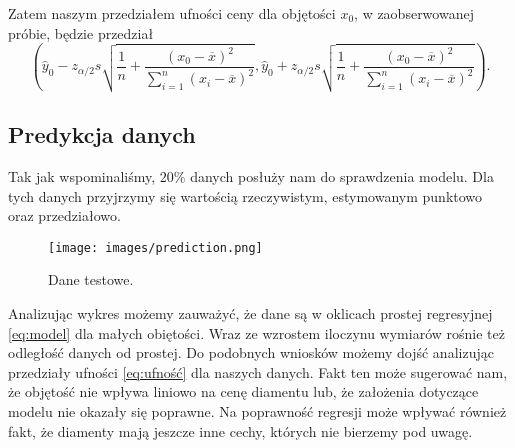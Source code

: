 \documentclass[12pt]{article}
\theoremstyle{exer}
\begin{document}
	\noindent Zatem naszym przedziałem ufności ceny dla objętości $x_0$, w zaobserwowanej próbie, będzie przedział
	\begin{equation}\label{eq:ufność}
		\left(\hat y_0 - 	z_{\alpha/2}s\sqrt{\frac{1}{n}+\frac{\left(x_0-\overline{x}\right)^2}{\sum_{i=1}^n\left(x_i-\overline{x}\right)^2}}, \hat y_0 + z_{\alpha/2}s\sqrt{\frac{1}{n}+\frac{\left(x_0-\overline{x}\right)^2}{\sum_{i=1}^n\left(x_i-\overline{x}\right)^2}}\right).
	\end{equation}
     
     \subsection{Predykcja danych}
     Tak jak wspominaliśmy, $ 20\% $ danych posłuży nam do sprawdzenia modelu. Dla tych danych przyjrzymy się wartością rzeczywistym, estymowanym punktowo oraz przedziałowo.
     
     
	\begin{figure}[H]
	\centering
	\texttt{[image: images/prediction.png]}
	\caption{Dane testowe.}
	\label{fig:prediction}
\end{figure}
Analizując wykres możemy zauważyć, że dane są w oklicach prostej regresyjnej \eqref{eq:model} dla małych obiętości. Wraz ze wzrostem iloczynu wymiarów rośnie też odległość danych od prostej. Do podobnych wniosków możemy dojść analizując przedziały ufności \eqref{eq:ufność} dla naszych danych. Fakt ten może sugerować nam, że objętość nie wpływa liniowo na cenę diamentu lub, że założenia dotyczące modelu nie okazały się poprawne.
Na poprawność regresji może wpływać również fakt, że diamenty mają jeszcze inne cechy, których nie bierzemy pod uwagę.
\end{document}
